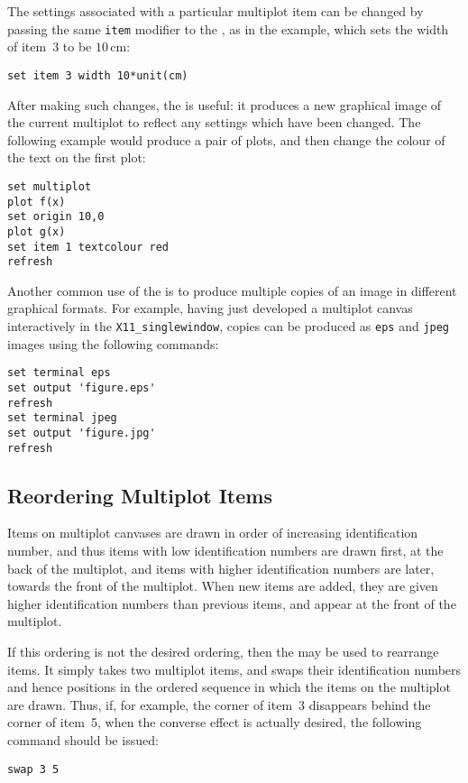 The settings associated with a particular multiplot item can be changed by
passing the same {\tt item} modifier to the , as in the example,
which sets the width of item~3 to be $10\,\mathrm{cm}$:
\begin{verbatim}
set item 3 width 10*unit(cm)
\end{verbatim}
After making such changes, the  is useful: it produces a new
graphical image of the current multiplot to reflect any settings which have
been changed. The following example would produce a pair of plots, and then
change the colour of the text on the first plot:
\begin{verbatim}
set multiplot
plot f(x)
set origin 10,0
plot g(x)
set item 1 textcolour red
refresh
\end{verbatim}

Another common use of the  is to produce multiple
copies of an image in different graphical formats. For example, having just
developed a multiplot canvas interactively in the {\tt X11\_singlewindow},
copies can be produced as {\tt eps} and {\tt jpeg} images using the following
commands:
\begin{verbatim}
set terminal eps
set output 'figure.eps'
refresh
set terminal jpeg
set output 'figure.jpg'
refresh
\end{verbatim}

\subsection{Reordering Multiplot Items}

Items on multiplot canvases are drawn in order of increasing identification
number, and thus items with low identification numbers are drawn first, at the
back of the multiplot, and items with higher identification numbers are later,
towards the front of the multiplot. When new items are added, they are given
higher identification numbers than previous items, and appear at the front of
the multiplot.

If this ordering is not the desired ordering, then the  may be
used to rearrange items. It simply takes two multiplot items, and swaps their
identification numbers and hence positions in the ordered sequence in which the
items on the multiplot are drawn. Thus, if, for example, the corner of item~3
disappears behind the corner of item~5, when the converse effect is actually
desired, the following command should be issued:
\begin{verbatim}
swap 3 5
\end{verbatim}

